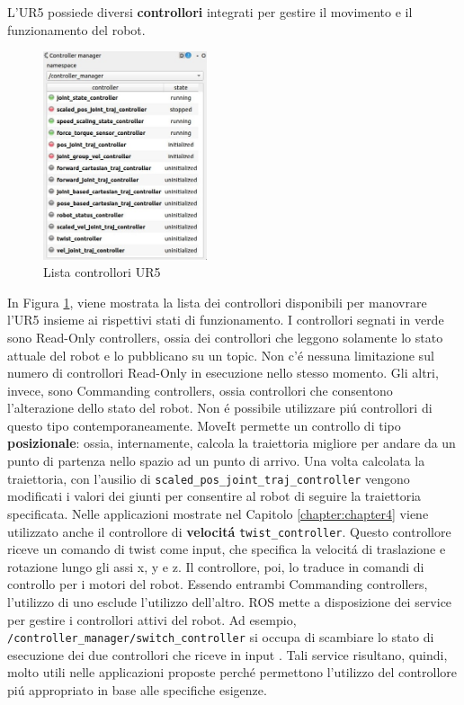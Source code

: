 L'UR5 possiede diversi \textbf{controllori} integrati per gestire il movimento e il funzionamento del robot. 
\begin{figure}[H]
    \centering
    \includegraphics*[width=0.43\textwidth]{images/controller_manager.png}
    \caption{Lista controllori UR5}
    \label{fig:controllers}
\end{figure}
In Figura \ref{fig:controllers}, viene mostrata la lista dei controllori disponibili per manovrare l'UR5 insieme ai rispettivi 
stati di funzionamento. 
I controllori segnati in verde sono Read-Only controllers, ossia dei controllori che leggono solamente lo stato attuale del 
robot e lo pubblicano su un topic. Non c'\'{e} nessuna limitazione sul numero di controllori Read-Only in esecuzione 
nello stesso momento. Gli altri, invece, sono Commanding controllers, ossia controllori che consentono l'alterazione dello 
stato del robot. Non \'{e} possibile utilizzare pi\'{u} controllori di questo tipo contemporaneamente. 
MoveIt permette un controllo di tipo \textbf{posizionale}: ossia, internamente, calcola la traiettoria migliore 
per andare da un punto di partenza nello spazio ad un punto di arrivo. 
Una volta calcolata la traiettoria, con l'ausilio di \verb|scaled_pos_joint_traj_controller| 
vengono modificati i valori dei giunti per consentire al robot di seguire la traiettoria specificata. 
Nelle applicazioni mostrate nel Capitolo \ref{chapter:chapter4} viene utilizzato anche il controllore di 
\textbf{velocit\'{a}} \verb|twist_controller|. Questo controllore riceve un comando di twist come input, 
che specifica la velocit\'{a} di traslazione e rotazione lungo gli assi x, y e z. 
Il controllore, poi, lo traduce in comandi di controllo per i motori del robot.
Essendo entrambi Commanding controllers, l'utilizzo di uno esclude l'utilizzo 
dell'altro. ROS mette a disposizione dei service per gestire i controllori attivi del robot. Ad esempio, 
\verb|/controller_manager/switch_controller| si occupa di scambiare lo stato di esecuzione dei due controllori che riceve 
in input \cite{controller_manager}. Tali service risultano, quindi, molto utili nelle applicazioni proposte perch\'{e} permettono 
l'utilizzo del controllore pi\'{u} appropriato in base alle specifiche esigenze.